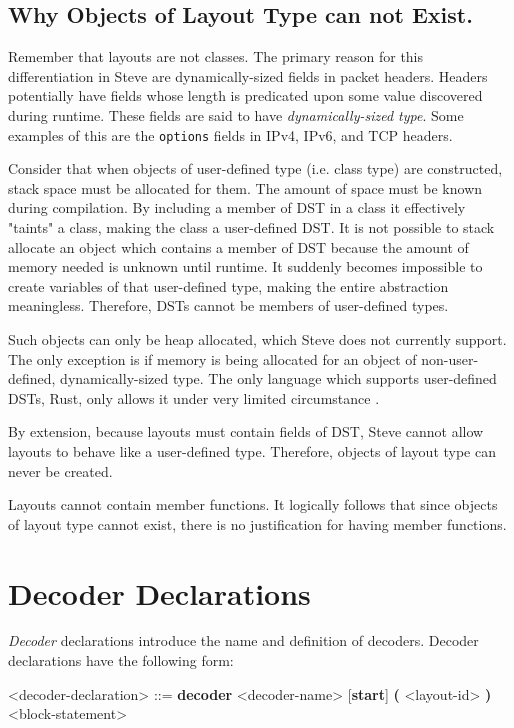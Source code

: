 \subsection{Why Objects of Layout Type can not Exist.}

Remember that layouts are not classes. The primary reason for this differentiation in Steve are dynamically-sized fields in packet headers. Headers potentially have fields whose length is predicated upon some value discovered during runtime. These fields are said to have \textit{dynamically-sized type}. Some examples of this are the \texttt{options} fields in IPv4, IPv6, and TCP headers. 

Consider that when objects of user-defined type (i.e. class type) are constructed, stack space must be allocated for them. The amount of space must be known during compilation. By including a member of DST in a class it effectively "taints" a class, making the class a user-defined DST. It is not possible to stack allocate an object which contains a member of DST because the amount of memory needed is unknown until runtime. It suddenly becomes impossible to create variables of that user-defined type, making the entire abstraction meaningless. Therefore, DSTs cannot be members of user-defined types. 

Such objects can only be heap allocated, which Steve does not currently support. The only exception is if memory is being allocated for an object of non-user-defined, dynamically-sized type. The only language which supports user-defined DSTs, Rust, only allows it under very limited circumstance \cite{rust_dst_std}.

By extension, because layouts must contain fields of DST, Steve cannot allow layouts to behave like a user-defined type. Therefore, objects of layout type can never be created.
  
Layouts cannot contain member functions. It logically follows that since objects of layout type cannot exist, there is no justification for having member functions.

\section{Decoder Declarations} \label{decoder_guide}

\textit{Decoder} declarations introduce the name and definition of decoders. Decoder declarations have the following form:

\begin{minip}
\begin{grammar}
\singlespace
<decoder-declaration> ::=
\textbf{decoder} <decoder-name> [\textbf{start}] 
\textbf{(} <layout-id> \textbf{)}
<block-statement>
\end{grammar}
\end{minip}

